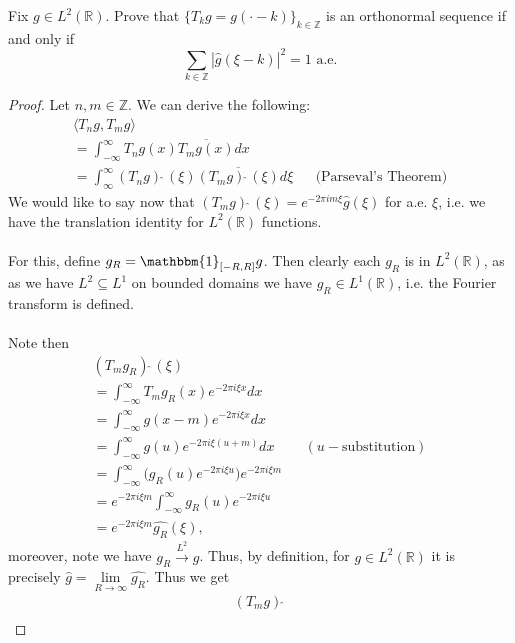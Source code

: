 \documentclass[12pt]{article}
\newenvironment{ex}[2][Exercise]{\begin{trivlist}
\item[\hskip \labelsep {\bfseries #1}\hskip \labelsep {\bfseries #2.}]}{\end{trivlist}}
\begin{document}
\begin{ex}{12}
    Fix $g \in L^2(\mathbb{R})$. Prove that $\{T_kg = g(\cdot - k)\}_{k \in \mathbb{Z}}$ is an orthonormal sequence if and only if 
    $$\sum_{k \in \mathbb{Z}} |\hat{g}(\xi - k)|^2 = 1 \text{ a.e.}$$
    \begin{proof}
        Let $n, m \in \mathbb{Z}$. We can derive the following:
        \begin{align*}
            \langle T_ng, T_mg \rangle \\
            = \int_{-\infty}^\infty T_ng(x)\overline{T_mg(x)}dx \\
            = \int_{\infty}^\infty (T_ng)\hat{\;}(\xi)\overline{(T_mg)\hat{\;}(\xi)} d\xi && \text{(Parseval's Theorem)}
        \end{align*}
        We would like to say now that $(T_mg)\hat{\;}(\xi) = e^{-2\pi i m \xi}\hat{g}(\xi)$ for a.e. $\xi$, i.e. we have the translation identity for $L^2(\mathbb{R})$ functions. 
        \\ \\ For this, define $g_R = \mathbbm{1}_{[-R, R]}g$. Then clearly each $g_R$ is in $L^2(\mathbb{R})$, as as we have $L^2 \subseteq L^1$ on bounded domains we have $g_R \in L^1(\mathbb{R})$, i.e. the Fourier transform is defined. \\ \\
        Note then 
        \begin{align*}
            (T_m g_R)\hat{\;}(\xi) \\
            = \int_{-\infty}^\infty T_mg_R(x)e^{-2\pi i \xi x}dx \\ 
            = \int_{-\infty}^\infty g(x- m)e^{-2\pi i \xi x}dx \\ 
            = \int_{-\infty}^\infty g(u)e^{-2\pi i \xi (u + m)}dx && (u-\text{substitution}) \\
            = \int_{-\infty}^\infty \Big ( g_R(u)e^{-2\pi i \xi u} \Big)e^{-2\pi i \xi m} \\
            = e^{-2\pi i \xi m} \int_{-\infty}^\infty g_R(u)e^{-2\pi i \xi u} \\ 
            = e^{-2\pi i \xi m} \hat{g_R}(\xi),
        \end{align*}
        moreover, note we have $g_R \xrightarrow{L^2} g$. Thus, by definition, for $g \in L^2(\mathbb{R})$ it is precisely $\hat{g} = \underset{R \rightarrow \infty}{\lim} \hat{g_R}$. Thus we get 
        \begin{align*}
            (T_m g)\hat{\;} \\

\end{align*}
\end{proof}
\end{ex}
\end{document}
